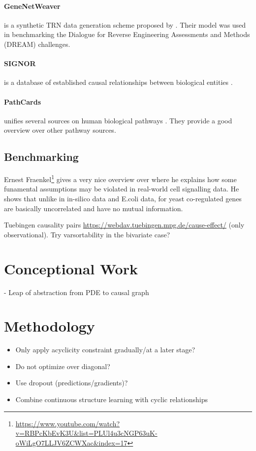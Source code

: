 \documentclass{article}
\begin{document}
\paragraph{GeneNetWeaver} is a synthetic TRN data generation scheme proposed by \cite{schaffter2011genenetweaver}. Their model was used in benchmarking the Dialogue for Reverse Engineering Assessments and Methods (DREAM) challenges.

\paragraph{SIGNOR} is a database of established causal relationships between biological entities \cite{perfetto2016signor}.

\paragraph{PathCards} unifies several sources on human biological pathways \cite{belinky2015pathcards}.
They provide a good overview over other pathway sources.

\subsection{Benchmarking}

Ernest Fraenkel\footnote{\url{https://www.youtube.com/watch?v=RBPcKbEvK3U&list=PLUl4u3cNGP63uK-oWiLgO7LLJV6ZCWXac&index=17}} gives a very nice overview over \cite{marbach2012wisdom} where he explains how some funamental assumptions may be violated in real-world cell signalling data.
He shows that unlike in in-silico data and E.coli data, for yeast co-regulated genes are basically uncorrelated and have no mutual information.

Tuebingen causality pairs \url{https://webdav.tuebingen.mpg.de/cause-effect/} (only observational).
Try varsortability in the bivariate case?

\section{Conceptional Work}
    - Leap of abstraction from PDE to causal graph

\section{Methodology}
\begin{itemize}
    \item Only apply acyclicity constraint gradually/at a later stage?
    \item Do not optimize over diagonal?
    \item Use dropout (predictions/gradients)?
    \item Combine continuous structure learning with cyclic relationships
\end{itemize}
\end{document}
